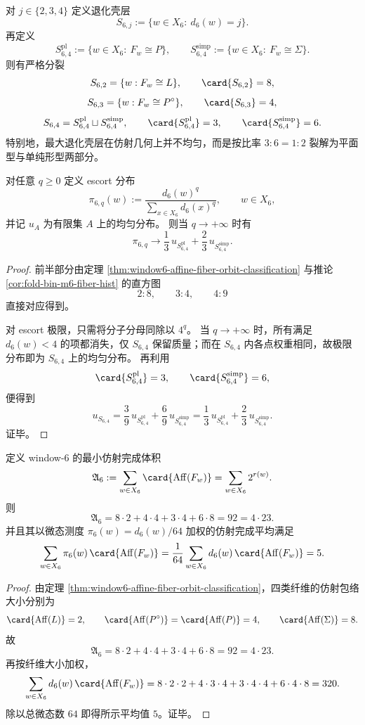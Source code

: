 \begin{corollary}\label{cor:window6-degenerate-shell-affine-splitting}
对 \(j\in\{2,3,4\}\) 定义退化壳层
\[
S_{6,j}:=\{w\in X_6:\ d_6(w)=j\}.
\]
再定义
\[
S_{6,4}^{\mathrm{pl}}:=\{w\in X_6:\ F_w\cong P\},
\qquad
S_{6,4}^{\mathrm{simp}}:=\{w\in X_6:\ F_w\cong \Sigma\}.
\]
则有严格分裂
\[
S_{6,2}=\{w:F_w\cong L\},\qquad \card{S_{6,2}}=8,
\]
\[
S_{6,3}=\{w:F_w\cong P^\circ\},\qquad \card{S_{6,3}}=4,
\]
\[
S_{6,4}=S_{6,4}^{\mathrm{pl}}\sqcup S_{6,4}^{\mathrm{simp}},
\qquad
\card{S_{6,4}^{\mathrm{pl}}}=3,
\qquad
\card{S_{6,4}^{\mathrm{simp}}}=6.
\]
特别地，最大退化壳层在仿射几何上并不均匀，而是按比率 \(3:6=1:2\) 裂解为平面型与单纯形型两部分。

对任意 \(q\ge 0\) 定义 escort 分布
\[
\pi_{6,q}(w):=\frac{d_6(w)^q}{\sum_{x\in X_6} d_6(x)^q},
\qquad w\in X_6,
\]
并记 \(u_A\) 为有限集 \(A\) 上的均匀分布。
则当 \(q\to+\infty\) 时有
\[
\pi_{6,q}\longrightarrow \frac13\,u_{S_{6,4}^{\mathrm{pl}}}+\frac23\,u_{S_{6,4}^{\mathrm{simp}}}.
\]
\end{corollary}
\begin{proof}
前半部分由定理 \ref{thm:window6-affine-fiber-orbit-classification} 与推论 \ref{cor:fold-bin-m6-fiber-hist} 的直方图
\[
2:8,\qquad 3:4,\qquad 4:9
\]
直接对应得到。

对 escort 极限，只需将分子分母同除以 \(4^q\)。
当 \(q\to+\infty\) 时，所有满足 \(d_6(w)<4\) 的项都消失，仅 \(S_{6,4}\) 保留质量；而在 \(S_{6,4}\) 内各点权重相同，故极限分布即为 \(S_{6,4}\) 上的均匀分布。
再利用
\[
\card{S_{6,4}^{\mathrm{pl}}}=3,\qquad \card{S_{6,4}^{\mathrm{simp}}}=6,
\]
便得到
\[
u_{S_{6,4}}
=\frac{3}{9}\,u_{S_{6,4}^{\mathrm{pl}}}+\frac{6}{9}\,u_{S_{6,4}^{\mathrm{simp}}}
=\frac13\,u_{S_{6,4}^{\mathrm{pl}}}+\frac23\,u_{S_{6,4}^{\mathrm{simp}}}.
\]
证毕。
\end{proof}

\begin{theorem}\label{thm:window6-affine-completion-volume-4x23}
定义 window-\(6\) 的最小仿射完成体积
\[
\mathfrak A_6:=\sum_{w\in X_6}\card{\operatorname{Aff}(F_w)}
=\sum_{w\in X_6}2^{r(w)}.
\]
则
\[
\mathfrak A_6
=8\cdot 2+4\cdot 4+3\cdot 4+6\cdot 8
=92
=4\cdot 23.
\]
并且其以微态测度 \(\pi_6(w)=d_6(w)/64\) 加权的仿射完成平均满足
\[
\sum_{w\in X_6}\pi_6(w)\,\card{\operatorname{Aff}(F_w)}
=\frac1{64}\sum_{w\in X_6}d_6(w)\,\card{\operatorname{Aff}(F_w)}
=5.
\]
\end{theorem}
\begin{proof}
由定理 \ref{thm:window6-affine-fiber-orbit-classification}，四类纤维的仿射包络大小分别为
\[
\card{\operatorname{Aff}(L)}=2,\qquad
\card{\operatorname{Aff}(P^\circ)}=\card{\operatorname{Aff}(P)}=4,\qquad
\card{\operatorname{Aff}(\Sigma)}=8.
\]
故
\[
\mathfrak A_6=8\cdot 2+4\cdot 4+3\cdot 4+6\cdot 8=92=4\cdot 23.
\]
再按纤维大小加权，
\[
\sum_{w\in X_6}d_6(w)\,\card{\operatorname{Aff}(F_w)}
=8\cdot 2\cdot 2+4\cdot 3\cdot 4+3\cdot 4\cdot 4+6\cdot 4\cdot 8
=320.
\]
除以总微态数 \(64\) 即得所示平均值 \(5\)。证毕。
\end{proof}

